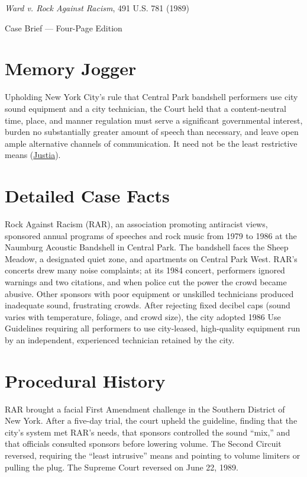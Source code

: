 \documentclass[12pt]{article}
\begin{document}
\begin{center}
{\LARGE \textit{Ward v. Rock Against Racism}, 491 U.S. 781 (1989)\par}
\vspace{0.8em}
{\large Case Brief --- Four-Page Edition\par}
\end{center}
\vspace{1em}

\section{Memory Jogger}

Upholding New York City's rule that Central Park bandshell performers use city sound equipment and a city technician, the Court held that a content-neutral time, place, and manner regulation must serve a significant governmental interest, burden no substantially greater amount of speech than necessary, and leave open ample alternative channels of communication. It need not be the least restrictive means (\href{https://supreme.justia.com/cases/federal/us/491/781/}{Justia}).

\section{Detailed Case Facts}

Rock Against Racism (RAR), an association promoting antiracist views, sponsored annual programs of speeches and rock music from 1979 to 1986 at the Naumburg Acoustic Bandshell in Central Park. The bandshell faces the Sheep Meadow, a designated quiet zone, and apartments on Central Park West. RAR's concerts drew many noise complaints; at its 1984 concert, performers ignored warnings and two citations, and when police cut the power the crowd became abusive. Other sponsors with poor equipment or unskilled technicians produced inadequate sound, frustrating crowds. After rejecting fixed decibel caps (sound varies with temperature, foliage, and crowd size), the city adopted 1986 Use Guidelines requiring all performers to use city-leased, high-quality equipment run by an independent, experienced technician retained by the city.

\section{Procedural History}

RAR brought a facial First Amendment challenge in the Southern District of New York. After a five-day trial, the court upheld the guideline, finding that the city's system met RAR's needs, that sponsors controlled the sound ``mix,'' and that officials consulted sponsors before lowering volume. The Second Circuit reversed, requiring the ``least intrusive'' means and pointing to volume limiters or pulling the plug. The Supreme Court reversed on June 22, 1989.
\end{document}
